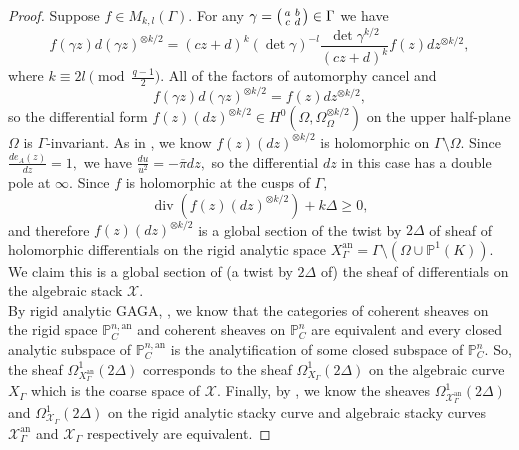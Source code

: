 \documentclass[11pt]{amsart}
\newtheorem{remark}[theorem]{Remark}
\theoremstyle{definition}
\newenvironment{psmallmatrix}
{\left(\begin{smallmatrix}}
	{\end{smallmatrix}\right)}
\numberwithin{equation}{section}
\newcommand{\cO}{\mathcal{O}}		%
\newcommand{\sX}{\mathscr{X}}		%
\newcommand{\bbP}{\mathbb{P}}		%
\begin{document}
		\begin{proof}
			Suppose $f\in M_{k,l}(\Gamma).$ For any $\displaystyle{\gamma=\begin{psmallmatrix}a&b\\c&d\end{psmallmatrix}\in \Gamma}$ we have \[
			f(\gamma z)d(\gamma z)^{\otimes k/2}= (cz+d)^k(\det\gamma)^{-l}\frac{\det\gamma^{k/2}}{(cz+d)^k} f(z)dz^{\otimes k/2},\] 
			where $k\equiv 2l\pmod{\frac{q-1}{2}}.$ All of the factors of automorphy cancel and \[f(\gamma z)d(\gamma z)^{\otimes k/2}=f(z)dz^{\otimes k/2},\] so the differential form $f(z)(dz)^{\otimes k/2}\in H^0(\Omega,\Omega_{\Omega}^{\otimes k/2})$ on the upper half-plane $\Omega$ is $\Gamma$-invariant. As in \cite[Section $(2.10)$]{Gekeler-jacobians}, we know $f(z)(dz)^{\otimes k/2}$ is holomorphic on $\Gamma\setminus \Omega.$
			Since $\displaystyle{\frac{de_A(z)}{dz}=1},$ we have 
			$\displaystyle{\frac{du}{u^2} = -\overline{\pi}dz,}$ so the differential $dz$ in this case has a double pole at $\infty.$
			Since $f$ is holomorphic at the cusps of $\Gamma,$ 
			\[\operatorname{div}(f(z)(dz)^{\otimes k/2}) +k\Delta\geq 0,\]
			and therefore $f(z)(dz)^{\otimes k/2}$ is a global section of the twist by $2\Delta$ of sheaf of holomorphic differentials on the rigid analytic space $X_{\Gamma}^{\text{an}}=\Gamma\setminus(\Omega\cup\bbP^1(K)).$
			We claim this is a global section of (a twist by $2\Delta$ of) the sheaf of differentials on the algebraic stack $\sX.$\\
			
			By rigid analytic GAGA, \cite[Theorem $4.10.5$]{Frensel-vanderPut-Rigid-Analytic_Geom}, we know that the categories of coherent sheaves on the rigid space $\bbP^{n,\text{an}}_C$ and coherent sheaves on $\bbP^n_C$ are equivalent and every closed analytic subspace of $\bbP^{n,\text{an}}_C$ is the analytification of some closed subspace of $\bbP^n_C.$ So, the sheaf $\Omega_{X_{\Gamma}^{\text{an}}}^1(2\Delta)$ corresponds to the sheaf $\Omega^1_{X_{\Gamma}}(2\Delta)$ on the algebraic curve $X_{\Gamma}$ which is the coarse space of $\sX.$ Finally, by \cite[Theorem $7.4$]{Porta-Yu-Higher-analytic-stacks-GAGA}, we know the sheaves $\Omega_{\sX_{\Gamma}^{\text{an}}}^1(2\Delta)$ and $\Omega^1_{\sX_{\Gamma}}(2\Delta)$ on the rigid analytic stacky curve and algebraic stacky curves $\sX_{\Gamma}^{\text{an}}$ and $\sX_{\Gamma}$ respectively are equivalent. 
			
			
		\end{proof}
		
\end{document}
